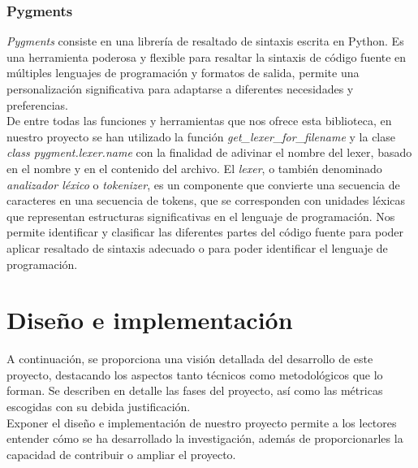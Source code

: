 \documentclass[a4paper, 12pt]{book}
\begin{document}
\subsection{Pygments}
\label{subsec:pygments}

\textit{Pygments} consiste en una librería de resaltado de sintaxis escrita en Python. Es una herramienta poderosa y flexible para resaltar la sintaxis de código fuente en múltiples lenguajes de programación y formatos
de salida, permite una personalización significativa para adaptarse a diferentes necesidades y preferencias.
\\De entre todas las funciones y herramientas que nos ofrece esta biblioteca, en nuestro proyecto se han utilizado la función \textit{get\_lexer\_for\_filename} y la clase \textit{class pygment.lexer.name} con la finalidad
de adivinar el nombre del lexer, basado en el nombre y en el contenido del archivo. El \textit{lexer}, o también denominado \textit{analizador léxico} o \textit{tokenizer}, es un componente que convierte una secuencia de caracteres
en una secuencia de tokens, que se corresponden con unidades léxicas que representan estructuras significativas en el lenguaje de programación. Nos permite identificar y clasificar las diferentes partes del código fuente para poder
aplicar resaltado de sintaxis adecuado o para poder identificar el lenguaje de programación.



\cleardoublepage
\chapter{Diseño e implementación}
\label{chap:diseño-implementacion}
\label{sec:diseno}

A continuación, se proporciona una visión detallada del desarrollo de este proyecto, destacando los aspectos tanto técnicos como metodológicos que lo forman. Se describen en detalle las fases del proyecto, así como las métricas escogidas
con su debida justificación.
\\Exponer el diseño e implementación de nuestro proyecto permite a los lectores entender cómo se ha desarrollado la investigación, además de proporcionarles la capacidad de contribuir o ampliar el proyecto.
\end{document}

